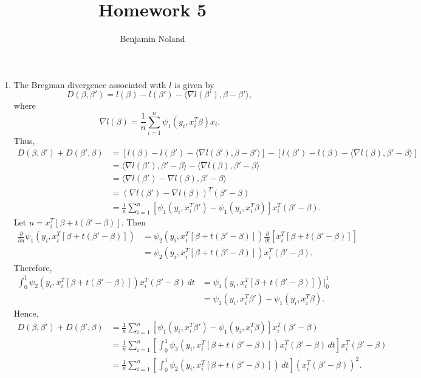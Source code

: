 \documentclass[12pt]{article}
\title{Homework 5}
\author{Benjamin Noland}
\date{}
\begin{document}
\maketitle

\begin{enumerate}
\item
The Bregman divergence associated with $l$ is given by
\begin{equation*}
D(\beta, \beta') = l(\beta) - l(\beta') - \langle \nabla l(\beta'), \beta - \beta' \rangle,
\end{equation*}
where
\begin{equation*}
\nabla l(\beta) = \frac{1}{n} \sum_{i=1}^n \psi_1(y_i, x_i^T\beta)x_i.
\end{equation*}
Thus,
\begin{align*}
D(\beta, \beta') + D(\beta', \beta) &= [l(\beta) - l(\beta') - \langle \nabla l(\beta'), \beta - \beta' \rangle] - [l(\beta') - l(\beta) - \langle \nabla l(\beta), \beta' - \beta \rangle] \\
&= \langle \nabla l(\beta'), \beta' - \beta \rangle - \langle \nabla l(\beta), \beta' - \beta \rangle \\
&= \langle \nabla l(\beta') - \nabla l(\beta), \beta' - \beta \rangle \\
&= (\nabla l(\beta') - \nabla l(\beta))^T (\beta' - \beta) \\
&= \frac{1}{n} \sum_{i=1}^n [\psi_1(y_i, x_i^T\beta') - \psi_1(y_i, x_i^T\beta)]x_i^T(\beta' - \beta).
\end{align*}
Let $u = x_i^T[\beta + t(\beta' - \beta)]$. Then
\begin{align*}
\frac{\partial}{\partial u} \psi_1(y_i, x_i^T[\beta + t(\beta' - \beta)]) &= \psi_2(y_i, x_i^T[\beta + t(\beta' - \beta)]) \frac{\partial}{\partial t} [x_i^T[\beta + t(\beta' - \beta)]] \\
&= \psi_2(y_i, x_i^T[\beta + t(\beta' - \beta)])x_i^T(\beta' - \beta).
\end{align*}
Therefore,
\begin{align*}
\int_0^1 \psi_2(y_i, x_i^T[\beta + t(\beta' - \beta)])x_i^T(\beta' - \beta) \, dt &= \psi_1(y_i, x_i^T[\beta + t(\beta' - \beta)]) \Big|_0^1 \\
&= \psi_1(y_i, x_i^T\beta') - \psi_1(y_i, x_i^T\beta).
\end{align*}
Hence,
\begin{align*}
D(\beta, \beta') + D(\beta', \beta) &= \frac{1}{n} \sum_{i=1}^n [\psi_1(y_i, x_i^T\beta') - \psi_1(y_i, x_i^T\beta)]x_i^T(\beta' - \beta) \\
&= \frac{1}{n} \sum_{i=1}^n \left[\int_0^1 \psi_2(y_i, x_i^T[\beta + t(\beta' - \beta)])x_i^T(\beta' - \beta) \, dt\right]x_i^T(\beta' - \beta) \\
&= \frac{1}{n} \sum_{i=1}^n \left[\int_0^1 \psi_2(y_i, x_i^T[\beta + t(\beta' - \beta)]) \, dt\right](x_i^T(\beta' - \beta))^2.
\end{align*}


\end{enumerate}
\end{document}
